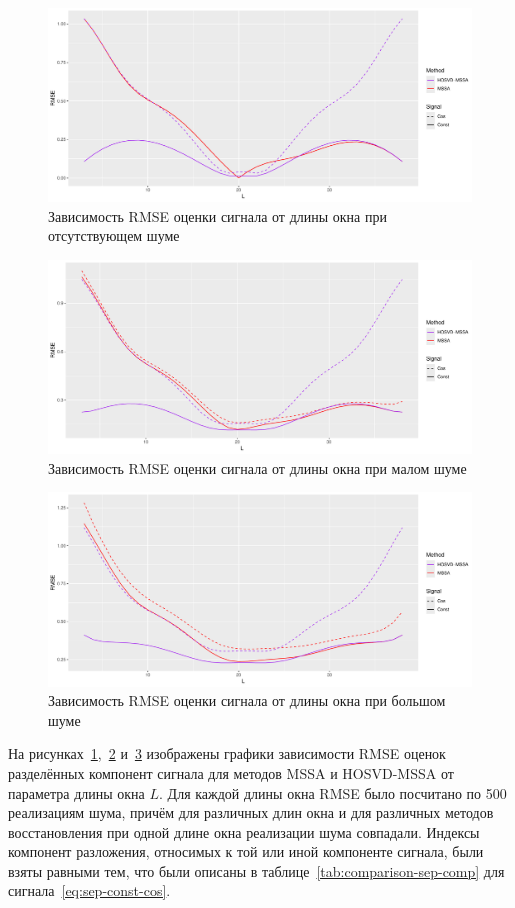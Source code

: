 \documentclass[specialist,
  substylefile=spbu.rtx,
subf,href,colorlinks=true, 12pt]{disser}
\theoremstyle{plain}
\theoremstyle{definition}
\theoremstyle{remark}
\begin{document}
\begin{figure}[!h]
  \centering
  \includegraphics[width=0.87\linewidth]{approx_sep_no_noise}
  \caption{Зависимость RMSE оценки сигнала от длины окна при отсутствующем шуме}
  \label{fig:approx-sep-no-noise}
\end{figure}
\begin{figure}[!h]
  \centering
  \includegraphics[width=0.87\linewidth]{approx_sep_small_noise}
  \caption{Зависимость RMSE оценки сигнала от длины окна при малом шуме}
  \label{fig:approx-sep-small-noise}
\end{figure}
\begin{figure}[!h]
  \centering
  \includegraphics[width=0.87\linewidth]{approx_sep_large_noise}
  \caption{Зависимость RMSE оценки сигнала от длины окна при большом шуме}
  \label{fig:approx-sep-large-noise}
\end{figure}

На рисунках~\ref{fig:approx-sep-no-noise},~\ref{fig:approx-sep-small-noise} и~\ref{fig:approx-sep-large-noise}
изображены графики зависимости RMSE оценок разделённых компонент сигнала для методов MSSA и HOSVD-MSSA от
параметра длины окна $L$.
Для каждой длины окна RMSE было посчитано по 500 реализациям шума, причём для различных длин окна
и для различных методов восстановления при одной длине окна реализации шума совпадали.
Индексы компонент разложения, относимых к той или иной компоненте сигнала, были взяты равными тем, что
были описаны в таблице~\ref{tab:comparison-sep-comp} для сигнала~\eqref{eq:sep-const-cos}.
\end{document}
